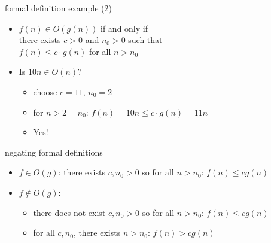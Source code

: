 \begin{frame}{formal definition example (2)}
    \begin{itemize}
    \item $f(n) \in O(g(n))$ if and only if \\
        \hspace{.5cm}there exists $c > 0$ and $n_0 > 0$ such that \\
        \hspace{.5cm}$f(n) \le c \cdot g(n)$ for all $n > n_0$
    \item Is $10n \in O(n)$?
        \begin{itemize}
        \item<2-> choose $c = 11$, $n_0 = 2$
        \item<2-> for $n > 2=n_0$: $f(n) = 10n \le c\cdot g(n) = 11n$
        \item<2-> Yes!
        \end{itemize}
    \end{itemize}
\end{frame}

\begin{frame}{negating formal definitions}
    \begin{itemize}
    \item $f \in O(g)$: there exists $c, n_0 > 0$ so for all $n > n_0$: $f(n) \le cg(n)$
    \item $f \not\in O(g)$:
        \begin{itemize}
            \item there does not exist $c, n_0 > 0$ so for all $n > n_0$: $f(n) \le cg(n)$
            \item for all $c, n_0$, there exists $n > n_0$: $f(n) > cg(n)$
        \end{itemize}
    \end{itemize}
\end{frame}


